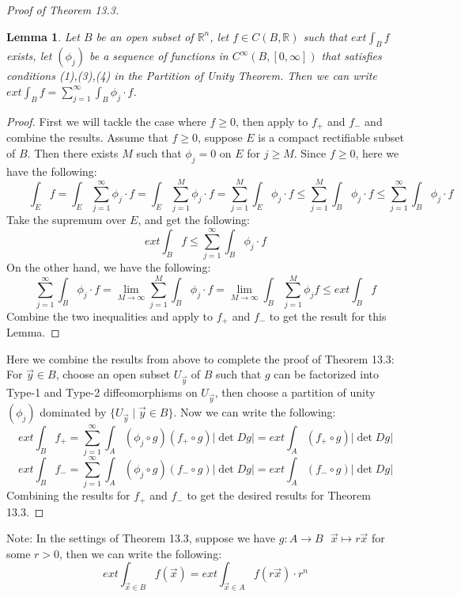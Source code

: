 \documentclass[15pt]{book}
\theoremstyle{break}
\theoremstyle{break}
\newtheorem{lem}{Lemma}[thm]
\newcommand{\R}{\mathbb{R}}
\newcommand{\note}{\color{red}Note: \color{black}}
\begin{document}
\begin{proof}[Proof of Theorem 13.3]
\begin{lem}\setlength{\leftskip}{1cm}
Let $B$ be an open subset of $\R^n$, let $f \in C(B ,\R)$ such that $ext\int_B f$ exists, let $(\phi_j)$ be a sequence of functions in $C^\infty(B,[0,\infty])$ that satisfies conditions (1),(3),(4) in the Partition of Unity Theorem. Then we can write $ext\int_B f = \sum_{j =1}^\infty \int_B \phi_j \cdot f$.
\end{lem}
\begin{proof}\setlength{\leftskip}{1cm}
First we will tackle the case where $f\geq 0$, then apply to $f_+$ and $f_-$ and combine the results. Assume that $f \geq 0$, suppose $E$ is a compact rectifiable subset of $B$. Then there exists $M$ such that $\phi_j = 0$ on $E$ for $j \geq M$. Since $f \geq 0$, here we have the following:
$${}\qquad\int_E f = \int_E \sum_{j=1}^\infty \phi_j\cdot f = \int_E \sum_{j=1}^M \phi_j \cdot f = \sum_{j=1}^M \int_E \phi_j \cdot f  \leq \sum_{j=1}^M \int_B \phi_j \cdot f \leq \sum_{j=1}^\infty \int_B \phi_j \cdot f$$
Take the supremum over $E$, and get the following:
$$ext \int_B f \leq \sum_{j=1}^\infty \int_B \phi_j \cdot f$$
On the other hand, we have the following:
$$\sum_{j=1}^\infty \int_B \phi_j\cdot f = \lim_{M \to \infty} \sum_{j=1}^M \int_B \phi_j\cdot f = \lim_{M\to \infty} \int_B \sum_{j=1}^M \phi_j f \leq ext\int_B f$$
Combine the two inequalities and apply to $f_+$ and $f_-$ to get the result for this Lemma.
\end{proof}

Here we combine the results from above to complete the proof of Theorem 13.3:\\

For $\vec{y}\in B$, choose an open subset $U_{\vec{y}}$ of $B$ such that $g$ can be factorized into Type-1 and Type-2 diffeomorphisms on $U_{\vec{y}}$, then choose a partition of unity $(\phi_j)$ dominated by $\{U_{\vec{y}} \mid \vec{y}\in B \}$. Now we can write the following:
$$ext\int_B f_+ = \sum_{j=1}^\infty \int_A (\phi_j \circ g) (f_+\circ g) |\det Dg| = ext \int_A (f_+\circ g)|\det Dg| $$
$$ext\int_B f_- = \sum_{j=1}^\infty \int_A (\phi_j \circ g) (f_-\circ g) |\det Dg| = ext \int_A (f_-\circ g)|\det Dg| $$
Combining the results for $f_+$ and $f_-$ to get the desired results for Theorem 13.3.
\end{proof}


\note In the settings of Theorem 13.3, suppose we have $g :A \to B \ \ \  \vec{x}\mapsto r \vec{x}$ for some $r >0$, then we can write the following:
$$ext \int_{\vec{x}\in B} f(\vec{x}) = ext\int_{\vec{x}\in A} f(r\vec{x})\cdot r^n$$
\end{document}
